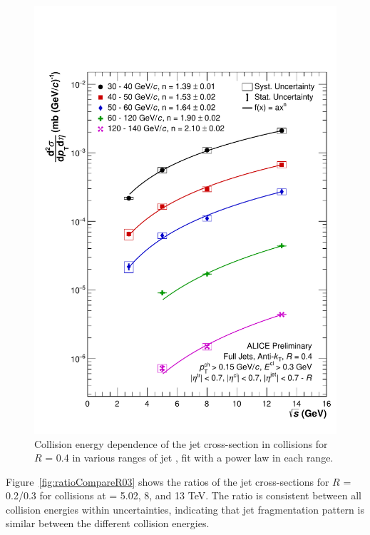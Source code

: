 \begin{figure}[hbt!]
    \centering
    \includegraphics[width=\textwidth]{figures/EnergyComparisons/sqrtSComp_R04.pdf}
    \caption{Collision energy dependence of the jet cross-section in \pp collisions for $R$ = 0.4 in various ranges of jet \pT, fit with a power law in each \pT range.}
    \label{fig:sqrtSCompareR04}
\end{figure}

Figure~\ref{fig:ratioCompareR03} shows the ratios of the jet cross-sections for $R$ = 0.2/0.3 for \pp collisions at \s = 5.02, 8, and 13 TeV. The ratio is consistent between all collision energies within uncertainties, indicating that jet fragmentation pattern is similar between the different collision energies.

